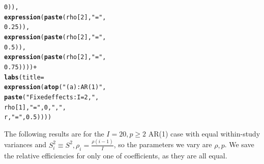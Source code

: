 \documentclass{article}\usepackage[]{graphicx}\usepackage[]{color}
\makeatletter
\newcommand{\hlnum}[1]{\textcolor[rgb]{0.686,0.059,0.569}{#1}}%
\newcommand{\hlstr}[1]{\textcolor[rgb]{0.192,0.494,0.8}{#1}}%
\newcommand{\hlopt}[1]{\textcolor[rgb]{0,0,0}{#1}}%
\newcommand{\hlstd}[1]{\textcolor[rgb]{0.345,0.345,0.345}{#1}}%
\newcommand{\hlkwc}[1]{\textcolor[rgb]{0.333,0.667,0.333}{#1}}%
\newcommand{\hlkwd}[1]{\textcolor[rgb]{0.737,0.353,0.396}{\textbf{#1}}}%
\newenvironment{kframe}{%
 \def\at@end@of@kframe{}%
 \ifinner\ifhmode%
  \def\at@end@of@kframe{\end{minipage}}%
  \begin{minipage}{\columnwidth}%
 \fi\fi%
 \def\FrameCommand##1{\hskip\@totalleftmargin \hskip-\fboxsep
 \colorbox{shadecolor}{##1}\hskip-\fboxsep
     \hskip-\linewidth \hskip-\@totalleftmargin \hskip\columnwidth}%
 \MakeFramed {\advance\hsize-\width
   \@totalleftmargin\z@ \linewidth\hsize
   \@setminipage}}%
 {\par\unskip\endMakeFramed%
 \at@end@of@kframe}
\newenvironment{knitrout}{}{} %
\makeatother
\begin{document}
\begin{knitrout}
\begin{kframe}
\begin{alltt}
                                            \hlnum{0}\hlstd{)),}
                           \hlkwd{expression}\hlstd{(}\hlkwd{paste}\hlstd{(rho[}\hlnum{2}\hlstd{],} \hlstr{"="}\hlstd{,}
                                            \hlnum{0.25}\hlstd{)),}
                           \hlkwd{expression}\hlstd{(}\hlkwd{paste}\hlstd{(rho[}\hlnum{2}\hlstd{],} \hlstr{"="}\hlstd{,}
                                            \hlnum{0.5}\hlstd{)),}
                           \hlkwd{expression}\hlstd{(}\hlkwd{paste}\hlstd{(rho[}\hlnum{2}\hlstd{],} \hlstr{"="}\hlstd{,}
                                            \hlnum{0.75}\hlstd{))))} \hlopt{+}
  \hlkwd{labs}\hlstd{(}\hlkwc{title}\hlstd{=}
         \hlkwd{expression}\hlstd{(}\hlkwd{atop}\hlstd{(}\hlstr{"(a): AR(1)"}\hlstd{,}
                         \hlkwd{paste}\hlstd{(}\hlstr{"Fixed effects: I = 2, "}\hlstd{,}
                               \hlstd{rho[}\hlnum{1}\hlstd{],} \hlstr{" = "}\hlstd{,} \hlnum{0}\hlstd{,} \hlstr{", "}\hlstd{,}
                               \hlstd{r,} \hlstr{" = "}\hlstd{,} \hlnum{0.5}\hlstd{))))}
\end{alltt}
\end{kframe}
\end{knitrout}

The following results are for the $I=20, p\ge 2$ AR(1) case with equal within-study variances
and $S_i^2 \equiv S^2, \rho_i = \frac{\rho(i-1)}{I}$, so the parameters we vary are $\rho, p$.
We save the relative efficiencies for only one of coefficients, as they are all equal.
\end{document}
